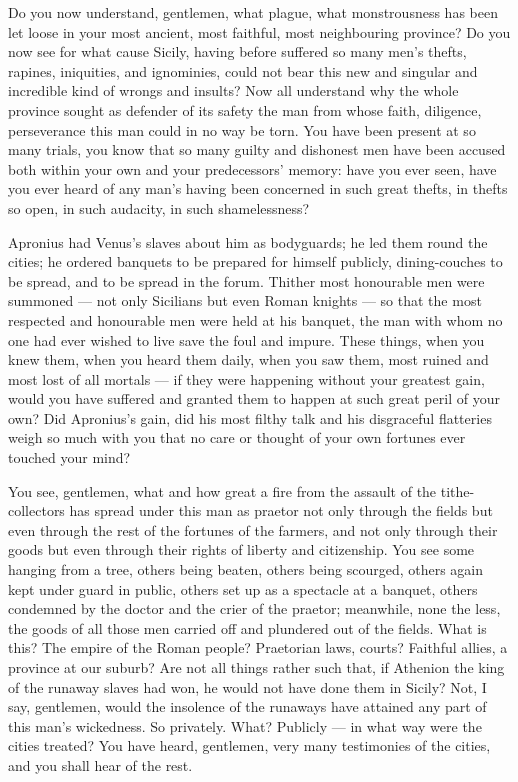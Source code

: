  Do you now understand, gentlemen, what plague, what monstrousness has been let loose in your most ancient, most faithful, most neighbouring province? Do you now see for what cause Sicily, having before suffered so many men's thefts, rapines, iniquities, and ignominies, could not bear this new and singular and incredible kind of wrongs and insults? Now all understand why the whole province sought as defender of its safety the man from whose faith, diligence, perseverance this man could in no way be torn. You have been present at so many trials, you know that so many guilty and dishonest men have been accused both within your own and your predecessors' memory: have you ever seen, have you ever heard of any man's having been concerned in such great thefts, in thefts so open, in such audacity, in such shamelessness?

 Apronius had Venus's slaves about him as bodyguards; he led them round the cities; he ordered banquets to be prepared for himself publicly, dining-couches to be spread, and to be spread in the forum. Thither most honourable men were summoned --- not only Sicilians but even Roman knights --- so that the most respected and honourable men were held at his banquet, the man with whom no one had ever wished to live save the foul and impure. These things, when you knew them, when you heard them daily, when you saw them, most ruined and most lost of all mortals --- if they were happening without your greatest gain, would you have suffered and granted them to happen at such great peril of your own? Did Apronius's gain, did his most filthy talk and his disgraceful flatteries weigh so much with you that no care or thought of your own fortunes ever touched your mind?

 You see, gentlemen, what and how great a fire from the assault of the tithe-collectors has spread under this man as praetor not only through the fields but even through the rest of the fortunes of the farmers, and not only through their goods but even through their rights of liberty and citizenship. You see some hanging from a tree, others being beaten, others being scourged, others again kept under guard in public, others set up as a spectacle at a banquet, others condemned by the doctor and the crier of the praetor; meanwhile, none the less, the goods of all those men carried off and plundered out of the fields. What is this? The empire of the Roman people? Praetorian laws, courts? Faithful allies, a province at our suburb? Are not all things rather such that, if Athenion the king of the runaway slaves had won, he would not have done them in Sicily? Not, I say, gentlemen, would the insolence of the runaways have attained any part of this man's wickedness. So privately. What? Publicly --- in what way were the cities treated? You have heard, gentlemen, very many testimonies of the cities, and you shall hear of the rest.

